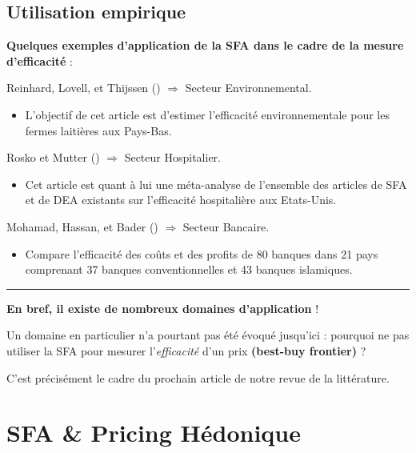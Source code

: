 \documentclass[
  12pt,
]{report}
\providecommand{\tightlist}{%
  \setlength{\itemsep}{0pt}\setlength{\parskip}{0pt}}\usepackage{longtable,booktabs,array}
\begin{document}
\newpage

\subsection{Utilisation empirique}\label{utilisation-empirique}

\textbf{Quelques exemples d'application de la SFA dans le cadre de la
mesure d'efficacité} :

Reinhard, Lovell, et Thijssen ()
\(\Rightarrow\) Secteur Environnemental.

\begin{itemize}
\tightlist
\item
  L'objectif de cet article est d'estimer l'efficacité environnementale
  pour les fermes laitières aux Pays-Bas.
\end{itemize}

Rosko et Mutter () \(\Rightarrow\) Secteur
Hospitalier.

\begin{itemize}
\tightlist
\item
  Cet article est quant à lui une méta-analyse de l'ensemble des
  articles de SFA et de DEA existants sur l'efficacité hospitalière aux
  Etats-Unis.
\end{itemize}

Mohamad, Hassan, et Bader ()
\(\Rightarrow\) Secteur Bancaire.

\begin{itemize}
\tightlist
\item
  Compare l'efficacité des coûts et des profits de 80 banques dans 21
  pays comprenant 37 banques conventionnelles et 43 banques islamiques.
\end{itemize}

\begin{center}\rule{0.5\linewidth}{0.5pt}\end{center}

\textbf{En bref, il existe de nombreux domaines d'application} !

Un domaine en particulier n'a pourtant pas été évoqué jusqu'ici :
pourquoi ne pas utiliser la SFA pour mesurer l'\emph{efficacité} d'un
prix \textbf{(best-buy frontier)} ?

C'est précisément le cadre du prochain article de notre revue de la
littérature.

\section{SFA \& Pricing Hédonique}\label{sfa-pricing-huxe9donique}
\end{document}
